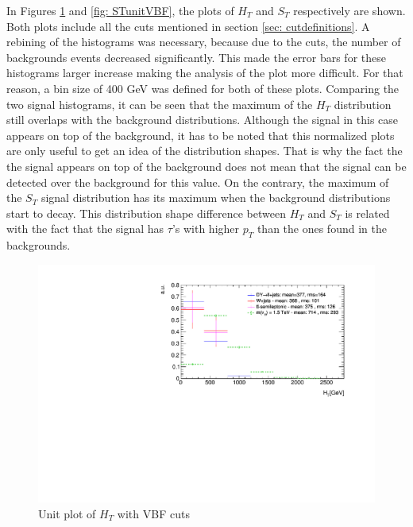 In Figures \ref{fig: HTunitVBF} and \ref{fig: STunitVBF}, the plots of $H_{T}$ and $S_{T}$ respectively are shown. Both plots include all the cuts mentioned in section \ref{sec: cutdefinitions}. A rebining of the histograms was necessary, because due to the cuts, the number of backgrounds events decreased significantly. This made the error bars for these histograms larger increase making the analysis of the plot more difficult. For that reason, a bin size of 400 GeV was defined for both of these plots. Comparing the two signal histograms, it can be seen that the maximum of the $H_{T}$ distribution still overlaps with the background distributions. Although the signal in this case appears on top of the background, it has to be noted that this normalized plots are only useful to get an idea of the distribution shapes. That is why the fact the the signal appears on top of the background does not mean that the signal can be detected over the background for this value. On the contrary, the maximum of the $S_{T}$ signal distribution has its maximum when the background distributions start to decay. This distribution shape  difference between $H_{T}$ and $S_{T}$ is related with the fact that the signal has $\tau$'s with higher $p_{T}$ than the ones found in the backgrounds.

\begin{figure}
\begin{center}
 \includegraphics[width=\linewidth]{Figures/Plots/HT_unitVBF.pdf}
\end{center}
\caption{Unit plot of $H_{T}$ with VBF cuts}
\label{fig: HTunitVBF}
\end{figure}

